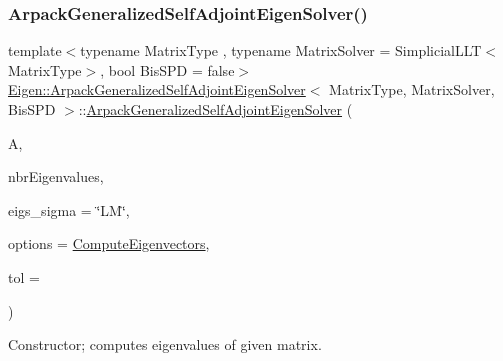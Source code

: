 \mbox{\label{class_eigen_1_1_arpack_generalized_self_adjoint_eigen_solver_a896d444b17b59c3b061800f579317a73}} 
\subsubsection{\texorpdfstring{Arpack\+Generalized\+Self\+Adjoint\+Eigen\+Solver()}{ArpackGeneralizedSelfAdjointEigenSolver()}\hspace{0.1cm}{\footnotesize\ttfamily [3/6]}}
{\footnotesize\ttfamily template$<$typename Matrix\+Type , typename Matrix\+Solver  = Simplicial\+L\+L\+T$<$\+Matrix\+Type$>$, bool Bis\+S\+PD = false$>$ \\
\hyperlink{class_eigen_1_1_arpack_generalized_self_adjoint_eigen_solver}{Eigen\+::\+Arpack\+Generalized\+Self\+Adjoint\+Eigen\+Solver}$<$ Matrix\+Type, Matrix\+Solver, Bis\+S\+PD $>$\+::\hyperlink{class_eigen_1_1_arpack_generalized_self_adjoint_eigen_solver}{Arpack\+Generalized\+Self\+Adjoint\+Eigen\+Solver} (\begin{DoxyParamCaption}\item[{const Matrix\+Type \&}]{A,  }\item[{Index}]{nbr\+Eigenvalues,  }\item[{std\+::string}]{eigs\+\_\+sigma = {\ttfamily \char`\"{}LM\char`\"{}},  }\item[{int}]{options = {\ttfamily \hyperlink{group__enums_ggae3e239fb70022eb8747994cf5d68b4a9ada93d8885bde32b876ba4af01d3292cc}{Compute\+Eigenvectors}},  }\item[{\hyperlink{class_eigen_1_1_arpack_generalized_self_adjoint_eigen_solver_a2555af55e53bf9de894a49e639be2e1e}{Real\+Scalar}}]{tol = {} }\end{DoxyParamCaption})\hspace{0.3cm}{\ttfamily [inline]}}



Constructor; computes eigenvalues of given matrix. 


